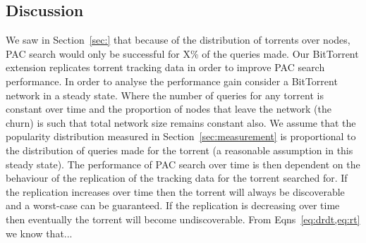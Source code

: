 \subsection{Discussion}\label{sec:extension:discussion}

    We saw in Section~\ref{sec:} that because of the distribution of torrents over nodes, PAC search would only be successful for X\% of the queries made. Our BitTorrent extension replicates torrent tracking data in order to improve PAC search performance. In order to analyse the performance gain consider a BitTorrent network in a steady state. Where the number of queries for any torrent is constant over time and the proportion of nodes that leave the network (the churn) is such that total network size remains constant also. We assume that the popularity distribution measured in Section~\ref{sec:measurement} is proportional to the distribution of queries made for the torrent (a reasonable assumption in this steady state). The performance of PAC search over time is then dependent on the behaviour of the replication of the tracking data for the torrent searched for. If the replication increases over time then the torrent will always be discoverable and a worst-case can be guaranteed. If the replication is decreasing over time then eventually the torrent will become undiscoverable. From Eqns~\ref{eq:drdt,eq:rt} we know that...

